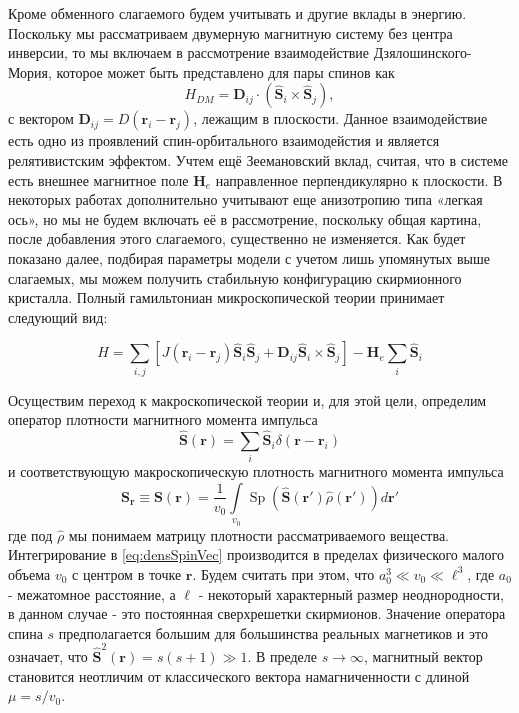 \documentclass[a4paper,article,14pt]{extarticle}
\DeclareMathOperator{\Sp}{Sp}
\begin{document}
Кроме обменного слагаемого будем учитывать и другие вклады в энергию. Поскольку мы рассматриваем двумерную магнитную систему без центра инверсии, то мы включаем в рассмотрение взаимодействие Дзялошинского-Мория, которое может быть представлено для пары спинов как 
$${H_{DM}} = {{\mathbf{D}}_{ij}} \cdot \left( {\widehat {\mathbf{S}}}_{i} \times {{\widehat {\mathbf{S}}}_j} \right), $$
с вектором $\mathbf{D}_{ij} = D \left(\mathbf{r}_i - \mathbf{r}_j \right)$, лежащим в плоскости. \cite{lacrox} Данное взаимодействие есть одно из проявлений спин-орбитального взаимодейстия и является релятивистским эффектом. Учтем ещё Зеемановский вклад, считая, что в системе есть внешнее магнитное поле $\mathbf{H}_e$ направленное перпендикулярно к плоскости. В некоторых работах дополнительно учитывают еще анизотропию типа «легкая ось», \cite{bogdanov} но мы не будем включать её в рассмотрение, поскольку общая картина, после добавления этого слагаемого, существенно не изменяется. Как будет показано далее, подбирая параметры модели с учетом лишь упомянутых выше слагаемых, мы можем получить стабильную конфигурацию скирмионного кристалла. Полный гамильтониан микроскопической теории принимает следующий вид:

\begin{equation}
\label{eq:ham_init}	
H = \sum\limits_{i,j} {\left[ {J\left( {{{\mathbf{r}}_i} - {{\mathbf{r}}_j}} \right){{\widehat {\mathbf{S}}}_i}{{\widehat {\mathbf{S}}}_j} + {{\mathbf{D}}_{ij}}  {{\widehat {\mathbf{S}}}_i} \times {{\widehat {\mathbf{S}}}_j}} \right] - \mathbf{H}_e} \sum\limits_{i} {{{\widehat {\mathbf{S}}}_i}}
\end{equation}

Осуществим переход к макроскопической теории и, для этой цели, определим оператор плотности магнитного момента импульса
\begin{equation}
\label{eq:densSpinOperator}	
{\widehat {\mathbf{S}}} (\mathbf{r}) = \sum_i {{\widehat {\mathbf{S}}}_i} \delta (\mathbf{r} - \mathbf{r}_i)
\end{equation}
и соответствующую макроскопическую плотность магнитного момента импульса
\begin{equation}
\label{eq:densSpinVec}	
{\mathbf{S}}_\mathbf{r} \equiv {\mathbf{S}} (\mathbf{r}) = \frac{1}{v_0} \int\limits_{v_0} {\Sp{\left( {\widehat {\mathbf{S}}} (\mathbf{r'}) {\widehat \rho  } (\mathbf{r'}) \right)} d \mathbf{r'} }
\end{equation}
где под ${ \widehat \rho }$ мы понимаем матрицу плотности рассматриваемого вещества. Интегрирование в \eqref{eq:densSpinVec} производится в пределах физического малого объема $v_0$ с центром в точке $\mathbf{r}$. Будем считать при этом, что $a_0^3  \ll v_0 \ll \ell^3 $, где $a_0$ - межатомное расстояние, а $\ell$ - некоторый характерный размер неоднородности, в данном случае - это постоянная сверхрешетки скирмионов. Значение оператора спина $s$ предполагается большим для большинства реальных магнетиков и это означает, что $\widehat{\mathbf{S}}^{2}({\mathbf{r}}) = s(s+1) \gg 1$. В пределе $s\to \infty$, магнитный вектор становится неотличим от классического вектора намагниченности с длиной $\mu = s/v_{0}$.
\end{document}
